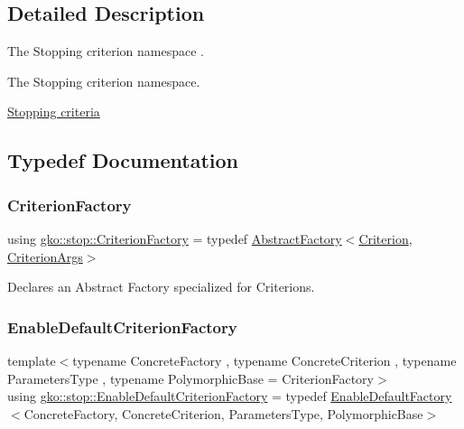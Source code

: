 \subsection{Detailed Description}
The Stopping criterion namespace . 

The Stopping criterion namespace.

\hyperlink{group__stop}{Stopping criteria} 

\subsection{Typedef Documentation}
\mbox{\label{namespacegko_1_1stop_ab12a51109c50b35ec36dc5a393d6a9a0}} 
\subsubsection{\texorpdfstring{Criterion\+Factory}{CriterionFactory}}
{\footnotesize\ttfamily using \hyperlink{namespacegko_1_1stop_ab12a51109c50b35ec36dc5a393d6a9a0}{gko\+::stop\+::\+Criterion\+Factory} = typedef \hyperlink{classgko_1_1AbstractFactory}{Abstract\+Factory}$<$\hyperlink{classgko_1_1stop_1_1Criterion}{Criterion}, \hyperlink{structgko_1_1stop_1_1CriterionArgs}{Criterion\+Args}$>$}



Declares an Abstract Factory specialized for Criterions. 

\mbox{\label{namespacegko_1_1stop_ab045b6fd7571f3234d9a63a5ee5a2252}} 
\subsubsection{\texorpdfstring{Enable\+Default\+Criterion\+Factory}{EnableDefaultCriterionFactory}}
{\footnotesize\ttfamily template$<$typename Concrete\+Factory , typename Concrete\+Criterion , typename Parameters\+Type , typename Polymorphic\+Base  = Criterion\+Factory$>$ \\
using \hyperlink{namespacegko_1_1stop_ab045b6fd7571f3234d9a63a5ee5a2252}{gko\+::stop\+::\+Enable\+Default\+Criterion\+Factory} = typedef \hyperlink{classgko_1_1EnableDefaultFactory}{Enable\+Default\+Factory}$<$Concrete\+Factory, Concrete\+Criterion, Parameters\+Type, Polymorphic\+Base$>$}



